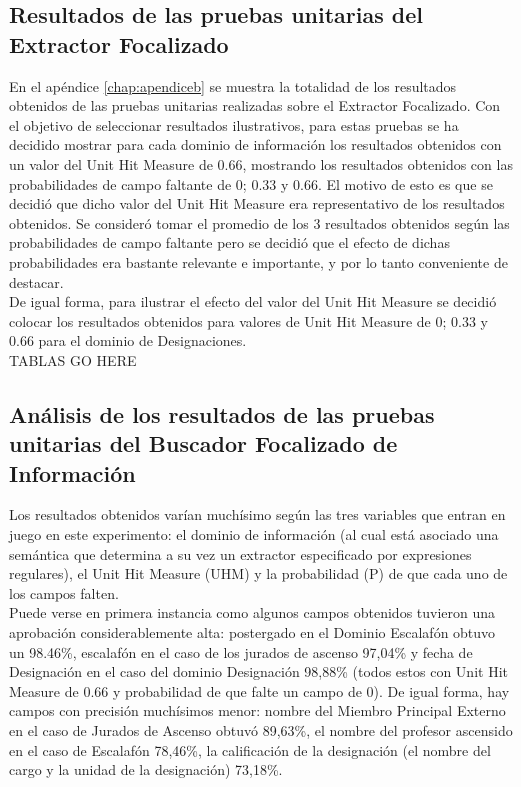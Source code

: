 \subsection{Resultados de las pruebas unitarias del Extractor Focalizado}

En el apéndice \ref{chap:apendiceb} se muestra la totalidad de los resultados obtenidos de las pruebas unitarias realizadas sobre el Extractor Focalizado. Con el objetivo de seleccionar resultados ilustrativos, para estas pruebas se ha decidido mostrar para cada dominio de información los resultados obtenidos con un valor del Unit Hit Measure de 0.66, mostrando los resultados obtenidos con las probabilidades de campo faltante de 0; 0.33 y 0.66. El motivo de esto es que se decidió que dicho valor del Unit Hit Measure era representativo de los resultados obtenidos. Se consideró tomar el promedio de los 3 resultados obtenidos según las probabilidades de campo faltante pero se decidió que el efecto de dichas probabilidades era bastante relevante e importante, y por lo tanto conveniente de destacar.\\

De igual forma, para ilustrar el efecto del valor del Unit Hit Measure se decidió colocar los resultados obtenidos para valores de Unit Hit Measure de 0; 0.33 y 0.66 para el dominio de Designaciones.\\

TABLAS GO HERE\\

%

\subsection{Análisis de los resultados de las pruebas unitarias del Buscador Focalizado de Información}

Los resultados obtenidos varían muchísimo según las tres variables que entran en juego en este experimento: el dominio de información (al cual está asociado una semántica que determina a su vez un extractor especificado por expresiones regulares), el Unit Hit Measure (UHM) y la probabilidad (P) de que cada uno de los campos falten.\\

Puede verse en primera instancia como algunos campos obtenidos tuvieron una aprobación considerablemente alta: postergado en el Dominio Escalafón obtuvo un 98.46\%, escalafón en el caso de los jurados de ascenso 97,04\% y fecha de Designación en el caso del dominio Designación 98,88\% (todos estos con Unit Hit Measure de 0.66 y probabilidad de que falte un campo de 0). De igual forma, hay campos con precisión muchísimos menor: nombre del Miembro Principal Externo en el caso de Jurados de Ascenso obtuvó 89,63\%, el nombre del profesor ascensido en el caso de Escalafón 78,46\%, la calificación de la designación (el nombre del cargo y la unidad de la designación) 73,18\%. \\

